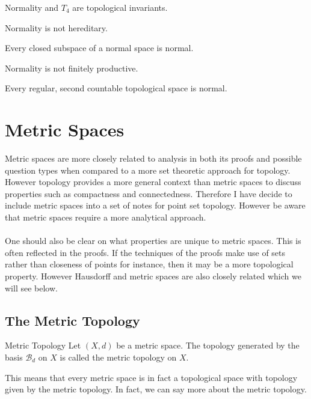 \documentclass[a4paper]{article}
\begin{document}
\begin{prp}{}{} Normality and $T_4$ are topological invariants. 
\end{prp}

\begin{prp}{}{} Normality is not hereditary. 
\end{prp}

\begin{prp}{}{} Every closed subspace of a normal space is normal. 
\end{prp}

\begin{prp}{}{} Normality is not finitely productive. 
\end{prp}

\begin{thm}{}{} Every regular, second countable topological space is normal. 
\end{thm}

\pagebreak
\section{Metric Spaces}
Metric spaces are more closely related to analysis in both its proofs and possible question types when compared to a more set theoretic approach for topology. However topology provides a more general context than metric spaces to discuss properties such as compactness and connectedness. Therefore I have decide to include metric spaces into a set of notes for point set topology. However be aware that metric spaces require a more analytical approach. \\~\\
One should also be clear on what properties are unique to metric spaces. This is often reflected in the proofs. If the techniques of the proofs make use of sets rather than closeness of points for instance, then it may be a more topological property. However Hausdorff and metric spaces are also closely related which we will see below. 

\subsection{The Metric Topology}
\begin{defn}{Metric Topology}{} Let $(X,d)$ be a metric space. The topology generated by the basis $\mathcal{B}_d$ on $X$ is called the metric topology on $X$. 
\end{defn}

This means that every metric space is in fact a topological space with topology given by the metric topology. In fact, we can say more about the metric topology. 
\end{document}
